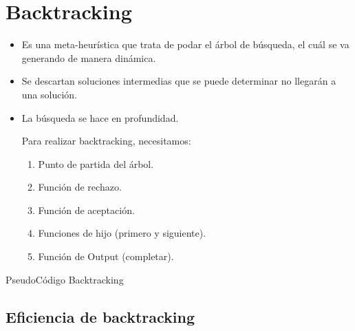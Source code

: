 \documentclass{templateNote}
\begin{document}
\portada
\margenes %

\section{Backtracking}
\begin{itemize}
    \item Es una meta-heurística que trata de podar el árbol de búsqueda, el cuál se va generando de manera dinámica.
    
    \item Se descartan soluciones intermedias que se puede determinar no llegarán a una solución.
    
    \item La búsqueda se hace en profundidad.

    Para realizar backtracking, necesitamos:
    \begin{enumerate}
        \item Punto de partida del árbol.
        
        \item Función de rechazo.
        
        \item Función de aceptación.
        
        \item Funciones de hijo (primero y siguiente).
        
        \item Función de Output (completar).
    \end{enumerate}
\end{itemize}

\begin{algorithm*}[H]
    \caption{PseudoCódigo Backtracking}
\end{algorithm*}

\subsection*{Eficiencia de backtracking}
\end{document}

